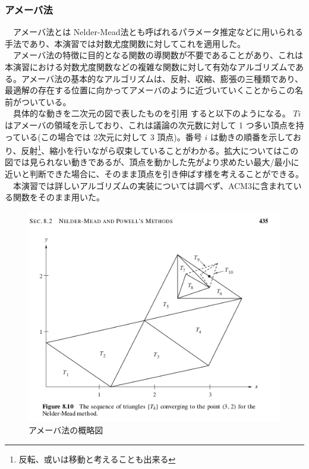 \documentclass[dvipdfmx]{scrartcl}
\begin{document}
\subsubsection{アメーバ法}
\label{sec:org3e28fb2}
　アメーバ法とは Nelder-Mead法とも呼ばれるパラメータ推定などに用いられる手法であり、本演習では対数尤度関数に対してこれを適用した。\\
　アメーバ法の特徴に目的となる関数の導関数が不要であることがあり、これは本演習における対数尤度関数などの複雑な関数に対して有効なアルゴリズムである。アメーバ法の基本的なアルゴリズムは、反射、収縮、膨張の三種類であり、最適解の存在する位置に向かってアメーバのように近づいていくことからこの名前がついている。\\
　具体的な動きを二次元の図で表したものを引用 \cite{nelder-mead} すると以下のようになる。 \(Ti\) はアメーバの領域を示しており、これは議論の次元数に対して 1 つ多い頂点を持っている(この場合では 2次元に対して 3 頂点)。番号 \(i\) は動きの順番を示しており、反射\footnote{反転、或いは移動と考えることも出来る}、縮小を行いながら収束していることがわかる。拡大についてはこの図では見られない動きであるが、頂点を動かした先がより求めたい最大/最小に近いと判断できた場合に、そのまま頂点を引き伸ばす様を考えることができる。\\
　本演習では詳しいアルゴリズムの実装については調べず、ACM3に含まれている関数をそのまま用いた。\\
\begin{figure}[htbp]
\centering
\includegraphics[width=15cm]{./nelder-mead.png}
\caption{アメーバ法の概略図}
\end{figure}
\end{document}
